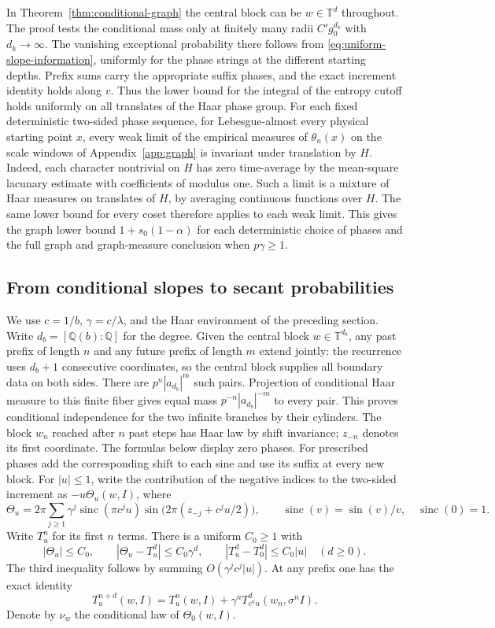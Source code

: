 \documentclass[11pt,a4paper]{article}
\newcommand{\T}{\mathbb T}
\begin{document}
In Theorem~\ref{thm:conditional-graph} the central block can be
$w\in\mathbb T^d$ throughout. The proof tests the conditional mass
only at finitely many radii $C'g_0^{d_k}$ with $d_k\to\infty$.
The vanishing exceptional probability there follows from
\eqref{eq:uniform-slope-information}, uniformly for the phase strings
at the different starting depths. Prefix sums carry the appropriate
suffix phases, and the exact increment identity holds along $v$.
Thus the lower bound for the integral of the entropy cutoff holds
uniformly on all translates of the Haar phase group. For each fixed
deterministic two-sided phase sequence, for Lebesgue-almost every
physical starting point $x$, every weak limit of the empirical measures
of $\theta_n(x)$ on the scale windows of Appendix~\ref{app:graph}
is invariant under translation by $H$. Indeed, each character nontrivial
on $H$ has zero time-average by the mean-square lacunary estimate
with coefficients of modulus one. Such a limit is a mixture of
Haar measures on translates of $H$, by averaging continuous
functions over $H$. The same lower bound for every coset therefore
applies to each weak limit. This gives the graph lower bound
$1+s_0(1-\alpha)$ for each deterministic choice of phases and
the full graph and graph-measure conclusion when $p\gamma\ge1$.

\subsection{From conditional slopes to secant probabilities}\label{sec:secant}
We use $c=1/b$, $\gamma=c/\lambda$, and the Haar environment of the
preceding section. Write $d_b=[\mathbb Q(b):\mathbb Q]$ for the degree.
Given the central block $w\in\T^{d_b}$, any past prefix
of length $n$ and any future prefix of length $m$ extend jointly:
the recurrence uses $d_b+1$ consecutive coordinates, so the central
block supplies all boundary data on both sides. There are
$p^n|a_{d_b}|^m$ such pairs. Projection of conditional Haar measure to
this finite fiber gives equal mass $p^{-n}|a_{d_b}|^{-m}$ to every pair.
This proves conditional independence for the two infinite branches
by their cylinders. The block $w_n$ reached after $n$ past steps has
Haar law by shift invariance; $z_{-n}$ denotes its first coordinate.
The formulas below display zero phases. For prescribed phases add the
corresponding shift to each sine and use its suffix at every new block.
For $|u|\le1$, write the contribution of the negative indices to
the two-sided increment as $-u\Theta_u(w,I)$, where
\[
 \Theta_u=2\pi\sum_{j\ge1}\gamma^j\operatorname{sinc}(\pi c^ju)
          \sin\bigl(2\pi(z_{-j}+c^ju/2)\bigr),
 \qquad \operatorname{sinc}(v)=\sin(v)/v,\quad \operatorname{sinc}(0)=1 .
\]
Write $T_u^n$ for its first $n$ terms. There is a uniform $C_0\ge1$ with
\[
 |\Theta_u|\le C_0,\qquad
 |\Theta_u-T_u^d|\le C_0\gamma^d,\qquad
 |T_u^d-T_0^d|\le C_0|u|\quad(d\ge0).
\]
The third inequality follows by summing $O(\gamma^jc^j|u|)$.
At any prefix one has the exact identity
\[
 T_u^{n+d}(w,I)=T_u^n(w,I)+
     \gamma^n T_{c^nu}^d(w_n,\sigma^n I).
\]
Denote by $\nu_w$ the conditional law of $\Theta_0(w,I)$.
\end{document}
